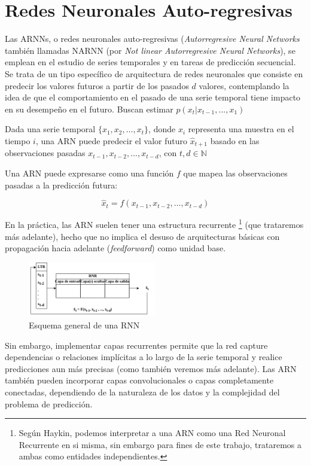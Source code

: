\newpage

\section{Redes Neuronales Auto-regresivas}

Las ARNNs, o redes neuronales auto-regresivas (\textit{Autorregresive Neural Networks} también llamadas NARNN (por \textit{Not linear Autorregresive Neural Networks}), se emplean en el estudio de series temporales y en tareas de predicción secuencial. Se trata de un tipo específico de arquitectura de redes neuronales que consiste en predecir los valores futuros a partir de los pasados $d$ valores, contemplando la idea de que el comportamiento en el pasado de una serie temporal tiene impacto en su desempeño en el futuro. Buscan estimar $p(x_{t} | x_{t-1}, ..., x_1)$

Dada una serie temporal $\{ x_1, x_2, \ldots, x_t \}$, donde $x_i$ representa una muestra en el tiempo $i$, una ARN puede predecir el valor futuro $\hat{x}_{t+1}$ basado en las observaciones pasadas $x_{t-1}, x_{t-2}, \ldots, x_{t-d}$, con $t,d \in \mathbb{N} $ 

Una ARN puede expresarse como una función $f$ que mapea las observaciones pasadas a la predicción futura:

\[
\hat{x}_{t} = f(x_{t-1}, x_{t-2}, \ldots, x_{t-d})
\]

En la práctica, las ARN suelen tener una estructura recurrente \footnote{Según Haykin, podemos interpretar a una ARN como una Red Neuronal Recurrente en si misma, sin embargo para fines de este trabajo, trataremos a ambas como entidades independientes.} (que trataremos más adelante), hecho que no implica el desuso de arquitecturas básicas con propagación hacia adelante (\textit{feedforward}) como unidad base. 

\begin{figure}[h]
    \centering
    \includegraphics[width=0.5\textwidth]{Figuras/redes_neuronales/NARNN_diagrama.png}
    \caption{Esquema general de una RNN} 
    \label{fig:rRNN_diagrama}
\end{figure}

Sin embargo, implementar capas recurrentes permite que la red capture dependencias o relaciones implícitas a lo largo de la serie temporal y realice predicciones aun más precisas (como también veremos más adelante). Las ARN también pueden incorporar capas convolucionales o capas completamente conectadas, dependiendo de la naturaleza de los datos y la complejidad del problema de predicción. 

